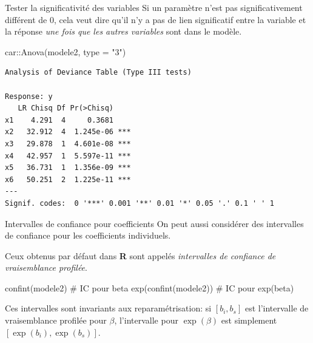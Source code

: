 \documentclass[
  ignorenonframetext,
]{beamer}
\newenvironment{Shaded}{\begin{snugshade}}{\end{snugshade}}
\newcommand{\AttributeTok}[1]{\textcolor[rgb]{0.40,0.45,0.13}{#1}}
\newcommand{\CommentTok}[1]{\textcolor[rgb]{0.37,0.37,0.37}{#1}}
\newcommand{\FunctionTok}[1]{\textcolor[rgb]{0.28,0.35,0.67}{#1}}
\newcommand{\NormalTok}[1]{\textcolor[rgb]{0.00,0.23,0.31}{#1}}
\newcommand{\SpecialCharTok}[1]{\textcolor[rgb]{0.37,0.37,0.37}{#1}}
\newcommand{\StringTok}[1]{\textcolor[rgb]{0.13,0.47,0.30}{#1}}
\begin{document}
\begin{frame}[fragile]{Tester la significativité des variables}
\protect\hypertarget{tester-la-significativituxe9-des-variables}{}
Si un paramètre n'est pas significativement différent de 0, cela veut
dire qu'il n'y a pas de lien significatif entre la variable et la
réponse \emph{une fois que les autres variables} sont dans le modèle.

\footnotesize

\begin{Shaded}
\begin{Highlighting}[numbers=left,,]
\NormalTok{car}\SpecialCharTok{::}\FunctionTok{Anova}\NormalTok{(modele2, }\AttributeTok{type =} \StringTok{"3"}\NormalTok{)}
\end{Highlighting}
\end{Shaded}

\begin{verbatim}
Analysis of Deviance Table (Type III tests)

Response: y
   LR Chisq Df Pr(>Chisq)    
x1    4.291  4     0.3681    
x2   32.912  4  1.245e-06 ***
x3   29.878  1  4.601e-08 ***
x4   42.957  1  5.597e-11 ***
x5   36.731  1  1.356e-09 ***
x6   50.251  2  1.225e-11 ***
---
Signif. codes:  0 '***' 0.001 '**' 0.01 '*' 0.05 '.' 0.1 ' ' 1
\end{verbatim}

\normalsize
\end{frame}

\begin{frame}[fragile]{Intervalles de confiance pour coefficients}
\protect\hypertarget{intervalles-de-confiance-pour-coefficients}{}
On peut aussi considérer des intervalles de confiance pour les
coefficients individuels.

Ceux obtenus par défaut dans \textbf{R} sont appelés \emph{intervalles
de confiance de vraisemblance profilée}.

\begin{Shaded}
\begin{Highlighting}[numbers=left,,]
\FunctionTok{confint}\NormalTok{(modele2)      }\CommentTok{\# IC pour beta}
\FunctionTok{exp}\NormalTok{(}\FunctionTok{confint}\NormalTok{(modele2)) }\CommentTok{\# IC pour exp(beta)}
\end{Highlighting}
\end{Shaded}

Ces intervalles sont invariants aux reparamétrisation: si \([b_i, b_s]\)
est l'intervalle de vraisemblance profilée pour \(\beta\), l'intervalle
pour \(\exp(\beta)\) est simplement \([\exp(b_i), \exp(b_s)]\).
\end{frame}
\end{document}

